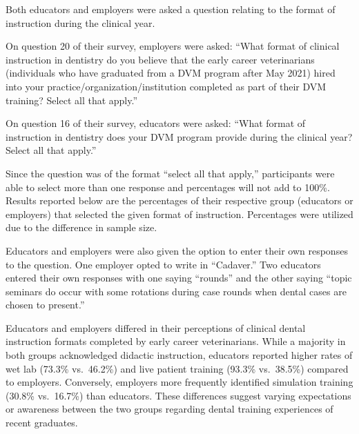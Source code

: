 \documentclass[
  11pt,
  letterpaper,
  DIV=11,
  numbers=noendperiod]{scrartcl}
\numberwithin{figure}{section}
\begin{document}
Both educators and employers were asked a question relating to the
format of instruction during the clinical year.

On question 20 of their survey, employers were asked: ``What format of
clinical instruction in dentistry do you believe that the early career
veterinarians (individuals who have graduated from a DVM program after
May 2021) hired into your practice/organization/institution completed as
part of their DVM training? Select all that apply.''

On question 16 of their survey, educators were asked: ``What format of
instruction in dentistry does your DVM program provide during the
clinical year? Select all that apply.''

Since the question was of the format ``select all that apply,''
participants were able to select more than one response and percentages
will not add to 100\%. Results reported below are the percentages of
their respective group (educators or employers) that selected the given
format of instruction. Percentages were utilized due to the difference
in sample size.

Educators and employers were also given the option to enter their own
responses to the question. One employer opted to write in ``Cadaver.''
Two educators entered their own responses with one saying ``rounds'' and
the other saying ``topic seminars do occur with some rotations during
case rounds when dental cases are chosen to present.''

Educators and employers differed in their perceptions of clinical dental
instruction formats completed by early career veterinarians. While a
majority in both groups acknowledged didactic instruction, educators
reported higher rates of wet lab (73.3\% vs.~46.2\%) and live patient
training (93.3\% vs.~38.5\%) compared to employers. Conversely,
employers more frequently identified simulation training (30.8\%
vs.~16.7\%) than educators. These differences suggest varying
expectations or awareness between the two groups regarding dental
training experiences of recent graduates.
\end{document}
